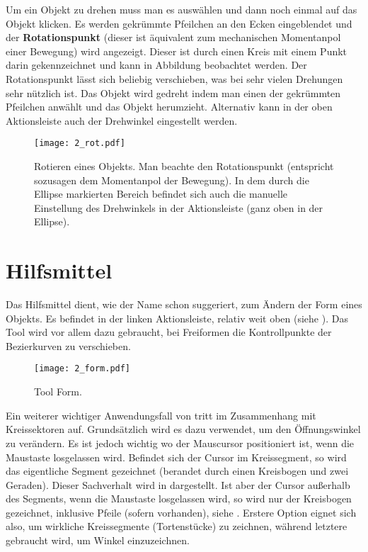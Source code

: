 Um ein Objekt zu drehen muss man es auswählen und dann noch einmal auf das
Objekt klicken. Es werden gekrümmte Pfeilchen an den Ecken eingeblendet und
der {\bf Rotationspunkt} (dieser ist äquivalent zum mechanischen Momentanpol
einer Bewegung) wird angezeigt. Dieser ist durch einen Kreis mit einem Punkt
darin gekennzeichnet und kann in Abbildung  beobachtet werden.
Der Rotationspunkt lässt sich beliebig verschieben, was bei sehr vielen
Drehungen sehr nützlich ist. Das Objekt wird gedreht indem man einen der
gekrümmten Pfeilchen anwählt und das Objekt herumzieht. Alternativ kann in
der oben Aktionsleiste auch der Drehwinkel eingestellt werden.

\begin{figure}[htbp]
  \texttt{[image: 2\_rot.pdf]}
  \caption{Rotieren eines Objekts. Man beachte den Rotationspunkt (entspricht
   sozusagen dem Momentanpol der Bewegung). In dem durch die Ellipse markierten
   Bereich befindet sich auch die manuelle Einstellung des Drehwinkels in
   der Aktionsleiste (ganz oben in der Ellipse).}
  \label{fig:rot}
\end{figure}

\newpage
\section{Hilfsmittel }

Das Hilfsmittel  dient, wie der Name schon suggeriert, zum Ändern
der Form eines Objekts. Es befindet in der linken Aktionsleiste, relativ weit
oben (siehe ). Das Tool wird vor allem dazu gebraucht, bei
Freiformen die Kontrollpunkte der Bezierkurven zu verschieben.

\begin{figure}[htbp]
  \texttt{[image: 2\_form.pdf]}
  \caption{Tool Form.}
  \label{fig:form}
\end{figure}

Ein weiterer wichtiger Anwendungsfall von  tritt im Zusammenhang
mit Kreissektoren auf. Grundsätzlich wird es dazu verwendet, um den 
Öffnungswinkel zu verändern. Es ist jedoch wichtig wo der Mauscursor
positioniert ist, wenn die Maustaste losgelassen wird. Befindet sich der Cursor
im Kreissegment, so wird das eigentliche Segment gezeichnet (berandet durch
einen Kreisbogen und zwei Geraden). Dieser Sachverhalt wird in 
 dargestellt. Ist aber der Cursor außerhalb des Segments,
wenn die Maustaste losgelassen wird, so wird nur der Kreisbogen gezeichnet,
inklusive Pfeile (sofern vorhanden), siehe . 
Erstere Option eignet sich also, um wirkliche Kreissegmente 
(\glqq{}Tortenstücke\grqq{}) zu zeichnen, während letztere gebraucht wird, um 
Winkel einzuzeichnen.

